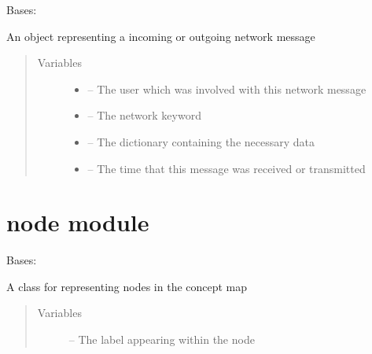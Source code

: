 \documentclass[letterpaper,10pt,english]{sphinxmanual}
\begin{document}
\begin{fulllineitems}
\label{\detokenize{logentry:logentry.LogEntry}}
Bases: 

An object representing a incoming or outgoing network message
\begin{quote}\begin{description}
\item[{Variables}] \leavevmode\begin{itemize}
\item {} 
{\hyperref[\detokenize{user:module-user}]{}} -- The user which was involved with this network message

\item {} 
\href{https://docs.python.org/2/library/keyword.html\#module-keyword}{} -- The network keyword

\item {} 
 -- The dictionary containing the necessary data

\item {} 
 -- The time that this message was received or transmitted

\end{itemize}

\end{description}\end{quote}

\end{fulllineitems}



\chapter{node module}
\label{\detokenize{node:node-module}}\label{\detokenize{node:module-node}}\label{\detokenize{node::doc}}

\begin{fulllineitems}
\label{\detokenize{node:node.Node}}
Bases: 

A class for representing nodes in the concept map
\begin{quote}\begin{description}
\item[{Variables}] \leavevmode
{} -- The label appearing within the node

\end{description}\end{quote}

\end{fulllineitems}
\end{document}

